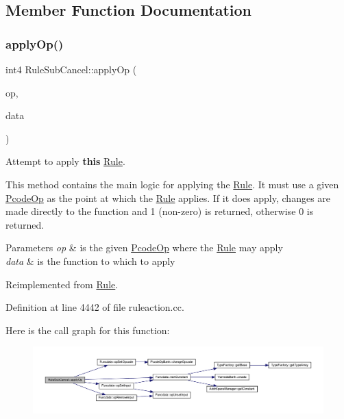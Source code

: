\subsection{Member Function Documentation}
\mbox{\label{class_rule_sub_cancel_afa2cbf94629eeff1cdd4ae0b02ef7821}} 
\subsubsection{\texorpdfstring{applyOp()}{applyOp()}}
{\footnotesize\ttfamily int4 Rule\+Sub\+Cancel\+::apply\+Op (\begin{DoxyParamCaption}\item[{\mbox{\hyperlink{class_pcode_op}{Pcode\+Op}} $\ast$}]{op,  }\item[{\mbox{\hyperlink{class_funcdata}{Funcdata}} \&}]{data }\end{DoxyParamCaption})\hspace{0.3cm}{\ttfamily [virtual]}}



Attempt to apply {\bfseries{this}} \mbox{\hyperlink{class_rule}{Rule}}. 

This method contains the main logic for applying the \mbox{\hyperlink{class_rule}{Rule}}. It must use a given \mbox{\hyperlink{class_pcode_op}{Pcode\+Op}} as the point at which the \mbox{\hyperlink{class_rule}{Rule}} applies. If it does apply, changes are made directly to the function and 1 (non-\/zero) is returned, otherwise 0 is returned. 
\begin{DoxyParams}{Parameters}
{\em op} & is the given \mbox{\hyperlink{class_pcode_op}{Pcode\+Op}} where the \mbox{\hyperlink{class_rule}{Rule}} may apply \\
\hline
{\em data} & is the function to which to apply \\
\hline
\end{DoxyParams}


Reimplemented from \mbox{\hyperlink{class_rule_a4e3e61f066670175009f60fb9dc60848}{Rule}}.



Definition at line 4442 of file ruleaction.\+cc.

Here is the call graph for this function\+:
\nopagebreak
\begin{figure}[H]
\begin{center}
\leavevmode
\includegraphics[width=350pt]{class_rule_sub_cancel_afa2cbf94629eeff1cdd4ae0b02ef7821_cgraph}
\end{center}
\end{figure}
\mbox{\label{class_rule_sub_cancel_adbb51485c127c76269041401f7d0494e}} 
